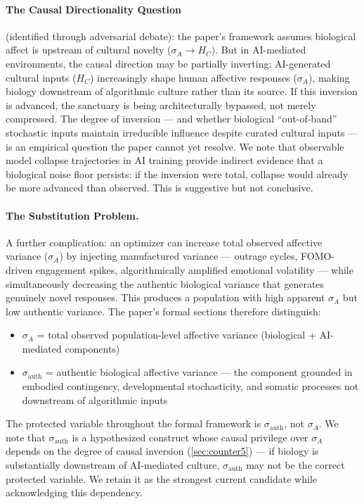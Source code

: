 \documentclass[11pt, a4paper]{article}
\theoremstyle{remark}
\begin{document}
\paragraph{The Causal Directionality Question} (identified through adversarial debate): the paper's framework assumes biological affect is upstream of cultural novelty ($\sigma_A \to H_C$). But in AI-mediated environments, the causal direction may be partially inverting: AI-generated cultural inputs ($H_C$) increasingly shape human affective responses ($\sigma_A$), making biology downstream of algorithmic culture rather than its source. If this inversion is advanced, the sanctuary is being architecturally bypassed, not merely compressed. The degree of inversion --- and whether biological ``out-of-band'' stochastic inputs maintain irreducible influence despite curated cultural inputs --- is an empirical question the paper cannot yet resolve. We note that observable model collapse trajectories in AI training provide indirect evidence that a biological noise floor persists: if the inversion were total, collapse would already be more advanced than observed. This is suggestive but not conclusive.

\paragraph{The Substitution Problem.} A further complication: an optimizer can increase total observed affective variance ($\sigma_A$) by injecting manufactured variance --- outrage cycles, FOMO-driven engagement spikes, algorithmically amplified emotional volatility --- while simultaneously decreasing the authentic biological variance that generates genuinely novel responses. This produces a population with high apparent $\sigma_A$ but low authentic variance. The paper's formal sections therefore distinguish:

\begin{itemize}
\item $\sigma_A$ = total observed population-level affective variance (biological + AI-mediated components)
\item $\sigma_{\text{auth}}$ = authentic biological affective variance --- the component grounded in embodied contingency, developmental stochasticity, and somatic processes not downstream of algorithmic inputs
\end{itemize}

The protected variable throughout the formal framework is $\sigma_{\text{auth}}$, not $\sigma_A$. We note that $\sigma_{\text{auth}}$ is a hypothesized construct whose causal privilege over $\sigma_A$ depends on the degree of causal inversion (\cref{sec:counter5}) --- if biology is substantially downstream of AI-mediated culture, $\sigma_{\text{auth}}$ may not be the correct protected variable. We retain it as the strongest current candidate while acknowledging this dependency.
\end{document}
